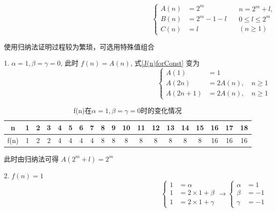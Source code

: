 \begin{equation}
	\left\{
	\begin{aligned}
		A(n) &= 2^m\\
		B(n) &= 2^m-1-l\\
		C(n) &= l
	\end{aligned}
	\right.\quad
	\begin{aligned}
    	n=2^m+l, \\ 
		0\leqslant l \leqslant 2^m \\
		(n\geqslant 1)
	\end{aligned}
\end{equation}

使用归纳法证明过程较为繁琐，可选用特殊值组合

1. $ \alpha =1, \beta=\gamma = 0 $, 此时 $ f(n) = A(n) $, 式\ref{J(n)forConst} 变为
\begin{equation*}
	\left\{
	\begin{aligned}
		A(1)&=1\\
		A(2n)   &= 2A(n),  \quad n\geqslant 1\\
		A(2n+1) &= 2A(n),  \quad n\geqslant 1
	\end{aligned}
	\right.
\end{equation*}

\begin{table}[htbp]
	\centering
	\small
	\caption{f(n)在$ \alpha =1, \beta=\gamma = 0 $时的变化情况}
	\begin{tabular}{c|cccccccccccccccccc}
		\toprule
		n   & 1 & 2 & 3 & 4 & 5 & 6 & 7 & 8 & 9 & 10 & 11 & 12 & 13 & 14 & 15 & 16 & 17 & 18 \\
		\midrule
		f(n)& 1 & 2 & 2 & 4 & 4 & 4 & 4 & 8 & 8 &  8 &  8 &  8 &  8 &  8 &  8 & 16 & 16 & 16 \\
		\bottomrule
	\end{tabular}%
	\label{tab:fncase1}%
\end{table}%

此时由归纳法可得 $ A(2^m+l)=2^m $

2. $ f(n) = 1 $
\begin{equation*}
	\left\{
	\begin{aligned}
		1 &= \alpha             \\
		1 &= 2\times 1 + \beta  \\
		1 &= 2\times 1 + \gamma 
	\end{aligned}
	\right.
	\rightarrow
	\left\{
	\begin{aligned}
		\alpha &= 1  \\
		\beta  &= -1 \\ 
		\gamma &= -1
	\end{aligned}
	\right.	
\end{equation*}


